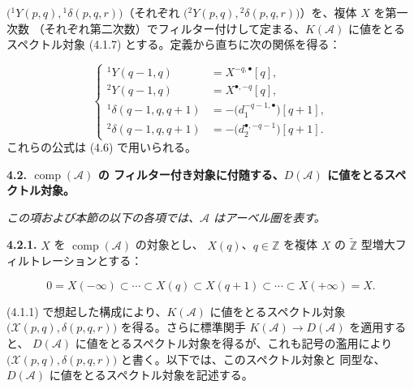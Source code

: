 \clearpage
{}%
\begingroup\small\setlength{\parskip}{0pt}\setlength{\emergencystretch}{1.5em}
\setlength{\abovedisplayskip}{4pt plus 2pt minus 2pt}%
\setlength{\belowdisplayskip}{4pt plus 2pt minus 2pt}%

\noindent $\bigl({}^{1}\!Y(p,q),{}^{1}\!\delta(p,q,r)\bigr)$（それぞれ
$\bigl({}^{2}\!Y(p,q),{}^{2}\!\delta(p,q,r)\bigr)$）を、複体 $X$ を第一次数
（それぞれ第二次数）でフィルター付けして定まる、$K(\mathcal A)$ に値をとる
スペクトル対象 (4.1.7) とする。定義から直ちに次の関係を得る：

\begin{equation}
\left\{
\begin{aligned}
{}^{1}\!Y(q-1,q)&=X^{-q,\bullet}[q],\\
{}^{2}\!Y(q-1,q)&=X^{\bullet,-q}[q],\\
{}^{1}\!\delta(q-1,q,q+1)&=-\bigl(d_1^{-q-1,\bullet}\bigr)[q+1],\\
{}^{2}\!\delta(q-1,q,q+1)&=-\bigl(d_2^{\bullet,-q-1}\bigr)[q+1].
\end{aligned}
\right.
\tag{4.1.9.1}
\end{equation}
これらの公式は (4.6) で用いられる。

\medskip\noindent\textbf{4.2. $\operatorname{comp}(\mathcal A)$ の
フィルター付き対象に付随する、$D(\mathcal A)$ に値をとるスペクトル対象。}

\begin{center}\itshape
この項および本節の以下の各項では、$\mathcal A$ はアーベル圏を表す。
\end{center}

\noindent\textbf{4.2.1.}\quad
$X$ を $\operatorname{comp}(\mathcal A)$ の対象とし、
$X(q)$、$q\in\mathbb Z$ を複体 $X$ の
$\widetilde{\mathbb Z}$ 型増大フィルトレーションとする：

\begin{equation}
0=X(-\infty)\subset\cdots\subset X(q)\subset X(q+1)
\subset\cdots\subset X(+\infty)=X.
\tag{4.2.1.1}
\end{equation}

(4.1.1) で想起した構成により、$K(\mathcal A)$ に値をとるスペクトル対象
$\bigl(\mathcal X(p,q),\delta(p,q,r)\bigr)$ を得る。さらに標準関手
$K(\mathcal A)\longrightarrow D(\mathcal A)$ を適用すると、
$D(\mathcal A)$ に値をとるスペクトル対象を得るが、これも記号の濫用により
$\bigl(\mathcal X(p,q),\delta(p,q,r)\bigr)$ と書く。以下では、このスペクトル対象と
同型な、$D(\mathcal A)$ に値をとるスペクトル対象を記述する。

